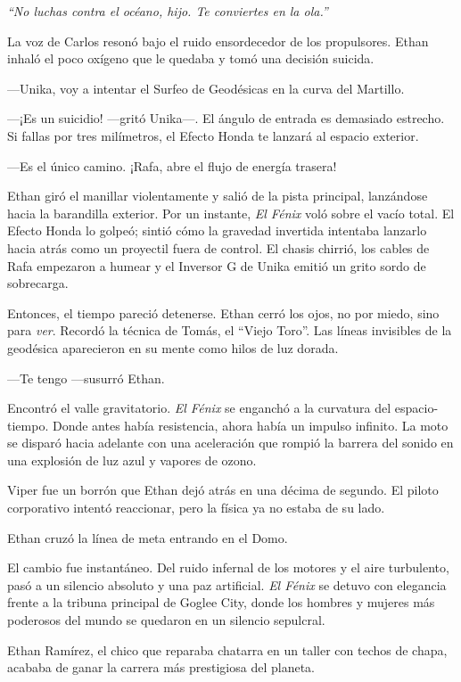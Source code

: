 \documentclass[12pt,a4paper]{book}
\begin{document}
\textit{``No luchas contra el océano, hijo. Te conviertes en la ola.''}

La voz de Carlos resonó bajo el ruido ensordecedor de los propulsores. Ethan inhaló el poco oxígeno que le quedaba y tomó una decisión suicida.

---Unika, voy a intentar el Surfeo de Geodésicas en la curva del Martillo.

---¡Es un suicidio! ---gritó Unika---. El ángulo de entrada es demasiado estrecho. Si fallas por tres milímetros, el Efecto Honda te lanzará al espacio exterior.

---Es el único camino. ¡Rafa, abre el flujo de energía trasera!

Ethan giró el manillar violentamente y salió de la pista principal, lanzándose hacia la barandilla exterior. Por un instante, \textit{El Fénix} voló sobre el vacío total. El Efecto Honda lo golpeó; sintió cómo la gravedad invertida intentaba lanzarlo hacia atrás como un proyectil fuera de control. El chasis chirrió, los cables de Rafa empezaron a humear y el Inversor G de Unika emitió un grito sordo de sobrecarga.

Entonces, el tiempo pareció detenerse. Ethan cerró los ojos, no por miedo, sino para \textit{ver}. Recordó la técnica de Tomás, el ``Viejo Toro''. Las líneas invisibles de la geodésica aparecieron en su mente como hilos de luz dorada.

---Te tengo ---susurró Ethan.

Encontró el valle gravitatorio. \textit{El Fénix} se enganchó a la curvatura del espacio-tiempo. Donde antes había resistencia, ahora había un impulso infinito. La moto se disparó hacia adelante con una aceleración que rompió la barrera del sonido en una explosión de luz azul y vapores de ozono.

Viper fue un borrón que Ethan dejó atrás en una décima de segundo. El piloto corporativo intentó reaccionar, pero la física ya no estaba de su lado.

Ethan cruzó la línea de meta entrando en el Domo.

El cambio fue instantáneo. Del ruido infernal de los motores y el aire turbulento, pasó a un silencio absoluto y una paz artificial. \textit{El Fénix} se detuvo con elegancia frente a la tribuna principal de Goglee City, donde los hombres y mujeres más poderosos del mundo se quedaron en un silencio sepulcral.

Ethan Ramírez, el chico que reparaba chatarra en un taller con techos de chapa, acababa de ganar la carrera más prestigiosa del planeta.
\end{document}
